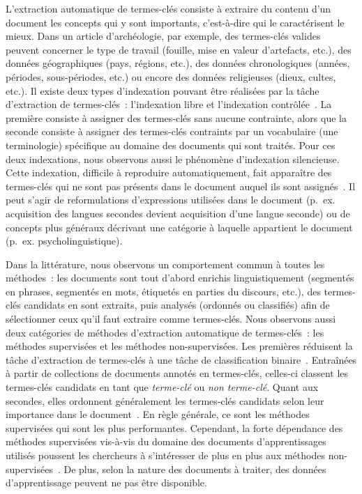       L'extraction automatique de termes-clés consiste à extraire du contenu
      d'un document les concepts qui y sont importants, c'est-à-dire qui le
      caractérisent le mieux. Dans un article d'archéologie, par exemple, des
      termes-clés valides peuvent concerner le type de travail (fouille, mise en
      valeur d'artefacts, etc.), des données géographiques (pays, régions,
      etc.), des données chronologiques (années, périodes, sous-périodes, etc.)
      ou encore des données religieuses (dieux, cultes, etc.). Il existe deux
      types d'indexation pouvant être réalisées par la tâche d'extraction de
      termes-clés~: l'indexation libre et l'indexation
      contrôlée~\citep{paroubek2012deft}. La première consiste à assigner des
      termes-clés sans aucune contrainte, alors que la seconde consiste à
      assigner des termes-clés contraints par un vocabulaire (une terminologie)
      spécifique au domaine des documents qui sont traités. Pour ces deux
      indexations, nous observons aussi le phénomène d'indexation silencieuse.
      Cette indexation, difficile à reproduire automatiquement, fait apparaître
      des termes-clés qui ne sont pas présents dans le document auquel ils sont
      assignés~\cite{liu2011vocabularygap}. Il peut s'agir de reformulations
      d'expressions utilisées dans le document (p.~ex. \og{}acquisition des
      langues secondes\fg{} devient \og{}acquisition d'une langue seconde\fg{})
      ou de concepts plus généraux décrivant une catégorie à laquelle appartient
      le document (p.~ex. \og{}psycholinguistique\fg{}).

      Dans la littérature, nous observons un comportement commun à toutes les
      méthodes~: les documents sont tout d'abord enrichis linguistiquement
      (segmentés en phrases, segmentés en mots, étiquetés en parties du
      discours, etc.), des termes-clés candidats en sont extraits, puis analysés
      (ordonnés ou classifiés) afin de sélectionner ceux qu'il faut extraire
      comme termes-clés. Nous observons aussi deux catégories de méthodes
      d'extraction automatique de termes-clés~: les méthodes supervisées et les
      méthodes non-supervisées. Les premières réduisent la tâche d'extraction de
      termes-clés à une tâche de classification binaire~\citep{witten1999kea}.
      Entraînées à partir de collections de documents annotés en termes-clés,
      celles-ci classent les termes-clés candidats en tant que
      \textit{terme-clé} ou \textit{non terme-clé}. Quant aux secondes, elles
      ordonnent généralement les termes-clés candidats selon leur importance
      dans le document~\citep{wan2008expandrank}. En règle générale, ce sont les
      méthodes supervisées qui sont les plus performantes. Cependant, la forte
      dépendance des méthodes supervisées vis-à-vis du domaine des documents
      d'apprentissages utilisés poussent les chercheurs à s'intéresser de plus
      en plus aux méthodes non-supervisées~\citep{hassan2010conundrums}. De
      plus, selon la nature des documents à traiter, des données d'apprentissage
      peuvent ne pas être disponible.


